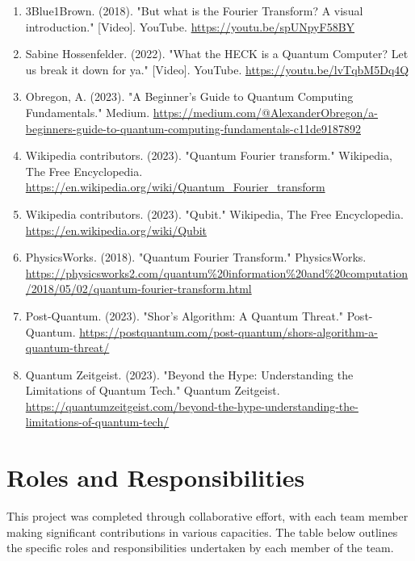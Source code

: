 \documentclass{article}
\begin{document}
\begin{enumerate}
    \item 3Blue1Brown. (2018). "But what is the Fourier Transform? A visual introduction." [Video]. YouTube.
          \url{https://youtu.be/spUNpyF58BY}

    \item Sabine Hossenfelder. (2022). "What the HECK is a Quantum Computer? Let us break it down for ya." [Video]. YouTube.
          \url{https://youtu.be/lvTqbM5Dq4Q}

    \item Obregon, A. (2023). "A Beginner's Guide to Quantum Computing Fundamentals." Medium.
          \url{https://medium.com/@AlexanderObregon/a-beginners-guide-to-quantum-computing-fundamentals-c11de9187892}

    \item Wikipedia contributors. (2023). "Quantum Fourier transform." Wikipedia, The Free Encyclopedia.
          \url{https://en.wikipedia.org/wiki/Quantum_Fourier_transform}

    \item Wikipedia contributors. (2023). "Qubit." Wikipedia, The Free Encyclopedia.
          \url{https://en.wikipedia.org/wiki/Qubit}

    \item PhysicsWorks. (2018). "Quantum Fourier Transform." PhysicsWorks.
          \url{https://physicsworks2.com/quantum%20information%20and%20computation/2018/05/02/quantum-fourier-transform.html}

    \item Post-Quantum. (2023). "Shor's Algorithm: A Quantum Threat." Post-Quantum.
          \url{https://postquantum.com/post-quantum/shors-algorithm-a-quantum-threat/}

    \item Quantum Zeitgeist. (2023). "Beyond the Hype: Understanding the Limitations of Quantum Tech." Quantum Zeitgeist.
          \url{https://quantumzeitgeist.com/beyond-the-hype-understanding-the-limitations-of-quantum-tech/}
\end{enumerate}

\newpage
\section{Roles and Responsibilities}
This project was completed through collaborative effort, with each team member making significant contributions in various capacities. The table below outlines the specific roles and responsibilities undertaken by each member of the team.
\end{document}
